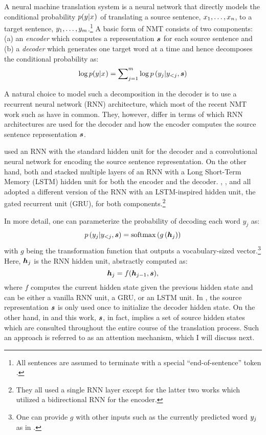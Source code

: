 A neural machine translation system is a neural network that directly models the conditional probability $p(y_{}|x_{})$ of translating
a source sentence, $x_{1},\ldots,x_{n}$, to a target sentence, $y_{1},\ldots,y_{m}$.\footnote{All sentences are assumed to terminate with a special ``end-of-sentence'' token \eos{}.}
A basic form of NMT consists of two components: (a) an {\it encoder} which computes a representation $\mbox{\boldmath{$s$}}$ for each source sentence  and (b) a {\it decoder} which generates one target word at a time and hence decomposes the conditional probability as:
\begin{equation}
\log p(y_{}|x_{}) = \sum_{j=1}^m \nolimits \log p\left(y_{j}|y_{<j},\mbox{\boldmath{$s$}}\right)
\end{equation}

A natural choice to model such a decomposition in the decoder is to use a recurrent neural network (RNN) architecture, which most of the recent NMT work such as \cite{kal13,sutskever14,cho14,bog15,luong15,jean15} have in common. They, however, differ in terms of which RNN architectures are used for the decoder and how the encoder computes the source sentence representation $\mbox{\boldmath{$s$}}$.

 used an RNN with the standard hidden unit for the decoder and a
convolutional neural network for encoding the source sentence representation. On
the other hand, both  and  stacked
multiple layers of an RNN with a Long Short-Term Memory (LSTM) hidden unit for
both the encoder and the decoder. , , and
 all adopted a different version of the RNN with an
LSTM-inspired hidden unit, the gated recurrent unit (GRU), for both
components.\footnote{They all used a single RNN layer except for the latter two
works which utilized a bidirectional RNN for the encoder.}

In more detail, one can parameterize the probability of decoding each word $y_j$ as:
\begin{equation}
p\left(y_{j}|y_{<j},\mbox{\boldmath{$s$}}\right) = \operatorname{softmax}\left(g\left(\bm{h}_{j}\right)\right)
\end{equation}
with $g$ being the transformation function that outputs a vocabulary-sized
vector.\footnote{One can provide $g$ with other inputs such as the currently
predicted word $y_{j}$ as in \cite{bog15}.} Here, $\bm{h}_{j}$ is the RNN hidden
unit, abstractly computed as:
\begin{equation}
\bm{h}_{j} = f(\bm{h}_{j-1}, \mbox{\boldmath{$s$}}),
\end{equation}
where $f$ computes the current hidden state given the previous hidden state and
can be either a vanilla RNN unit, a GRU, or an LSTM unit. In \cite{kal13,sutskever14,cho14,luong15}, the source representation $\mbox{\boldmath{$s$}}$ is only used once to initialize the decoder hidden state. On the other hand, in \cite{bog15,jean15} and this work, $\mbox{\boldmath{$s$}}$, in fact, implies a set of source hidden states which are consulted throughout the entire course of the translation process. Such an approach is referred to as an attention mechanism, which I will discuss next.

